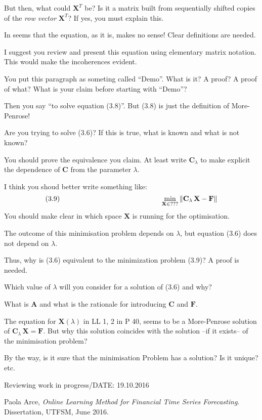 \documentclass[12pt,reqno]{amsart}
\begin{document}
\begin{description}[style=unboxed,leftmargin=0cm,itemsep=3ex]
But then, what could $\mathbf{X}^T$ be?
Is it a matrix built from sequentially shifted copies of the 
{\em row vector\/} $\mathbf{X}^T$?
If yes, you must explain this.

In seems that the equation, as it is, makes no sense!
Clear definitions are needed.

I suggest you review and present this equation using elementary matrix
notation. This would make the incoherences evident.


You put this paragraph as someting called ``Demo''.
What is it? A proof? A proof of what? 
What is your claim before starting with ``Demo''?

Then you say ``to solve equation (3.8)''.
But (3.8) is just the definition of More-Penrose!

Are you trying to solve (3.6)?
If this is true, what is known and what is not known?

You should prove the equivalence you claim.
At least write $\mathbf{C}_\lambda$ to make explicit the dependence of
$\mathbf{C}$ from the parameter $\lambda$.

I think you shoud better write something like:
$$
(3.9)\rule{50mm}{0pt} \min_{\mathbf X \in \text{???}}
\|\mathbf{C}_\lambda\,\mathbf{X}-\mathbf{F}\|
$$
You should make clear in which space $\mathbf{X}$ is running for the
optimisation.

The outcome of this minimisation problem depends on $\lambda$, but
equation (3.6) does not depend on $\lambda$.

Thus, why is (3.6) equivalent to the minimization problem (3.9)?
A proof is needed.

Which value of $\lambda$ will you consider for a solution of (3.6) and why?

What is $\mathbf{A}$ and what is the rationale for introducing $\mathbf{C}$
and $\mathbf{F}$.

The equation for $\mathbf{X}(\lambda)$ in LL 1, 2 in P 40, seems to be a
More-Penrose solution of $\mathbf{C}_\lambda\,\mathbf{X}=\mathbf{F}$.
But why this solution coincides with the solution --if it exists-- of the
minimisation problem?

By the way, is it sure that the minimisation Problem has a solution?
Is it unique? etc.

\end{description}

Reviewing work in progress/DATE: 19.10.2016

\begin{thebibliography}{99}
Paola Arce, 
{\em Online Learning Method for Financial Time Series Forecasting\/}.
Dissertation, UTFSM, June 2016.

\end{thebibliography}
\end{document}
